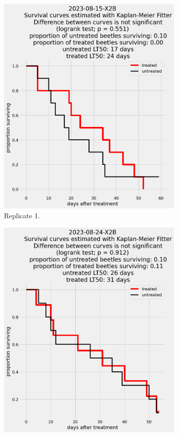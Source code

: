 \documentclass[12pt,letterpaper,english,bibliography=totocnumbered, abstract=on]{scrartcl}
\begin{document}
\begin{figure}[h]
	\centering
	\begin{subfigure}{.3\textwidth}
		\includegraphics[width=\linewidth]{images/survival_curves/2023-08-15-X2B}
		\caption{Replicate 1.}
	\end{subfigure}
	\begin{subfigure}{.3\textwidth}
		\includegraphics[width=\textwidth]{images/survival_curves/2023-08-24-X2B}

\end{subfigure}
\end{figure}
\end{document}
